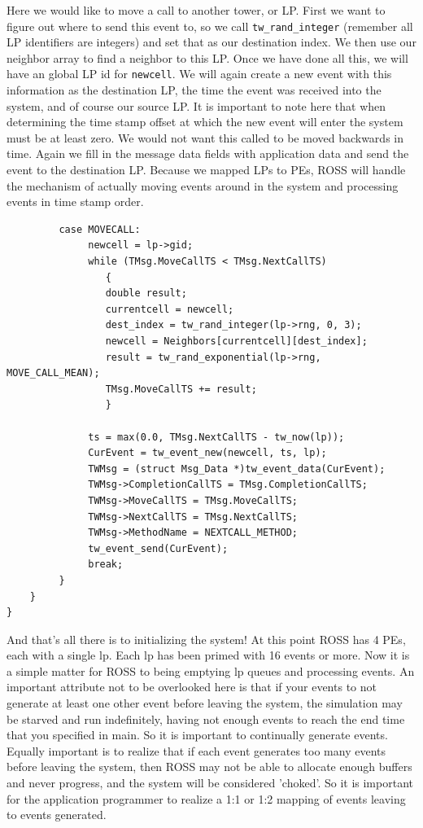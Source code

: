 \documentclass[12pt]{article}
\begin{document}
Here we would like to move a call to another tower, or LP.  First we want to
figure out where to send this event to, so we call {\tt tw\_rand\_integer}
(remember all LP identifiers are integers) and set that as our destination
index.  We then use our neighbor array to find a neighbor to this LP.  Once we
have done all this, we will have an global LP id for {\tt newcell}.  We will
again create a new event with this information as the destination LP, the time
the event was received into the system, and of course our source LP.  It is
important to note here that when determining the time stamp offset at which
the new event will enter the system must be at least zero.  We would not want
this called to be moved backwards in time.  Again we fill in the message data
fields with application data and send the event to the destination LP.
Because we mapped LPs to PEs, ROSS will handle the mechanism of actually
moving events around in the system and processing events in time stamp order.

\begin{verbatim} 
         case MOVECALL:
              newcell = lp->gid;
              while (TMsg.MoveCallTS < TMsg.NextCallTS)
                 {
                 double result;
                 currentcell = newcell;
                 dest_index = tw_rand_integer(lp->rng, 0, 3);
                 newcell = Neighbors[currentcell][dest_index];
                 result = tw_rand_exponential(lp->rng, MOVE_CALL_MEAN);
                 TMsg.MoveCallTS += result;
                 }

              ts = max(0.0, TMsg.NextCallTS - tw_now(lp));
              CurEvent = tw_event_new(newcell, ts, lp);
              TWMsg = (struct Msg_Data *)tw_event_data(CurEvent);
              TWMsg->CompletionCallTS = TMsg.CompletionCallTS;
              TWMsg->MoveCallTS = TMsg.MoveCallTS;
              TWMsg->NextCallTS = TMsg.NextCallTS;
              TWMsg->MethodName = NEXTCALL_METHOD;
              tw_event_send(CurEvent);
              break;
         }
    }
}
\end{verbatim} 

And that's all there is to initializing the system!  At this point ROSS has 4
PEs, each with a single lp.  Each lp has been primed with 16 events or more.
Now it is a simple matter for ROSS to being emptying lp queues and processing
events.  An important attribute not to be overlooked here is that if your
events to not generate at least one other event before leaving the system, the
simulation may be starved and run indefinitely, having not enough events to
reach the end time that you specified in main.  So it is important to
continually generate events.  Equally important is to realize that if each
event generates too many events before leaving the system, then ROSS may not
be able to allocate enough buffers and never progress, and the system will be
considered 'choked'.  So it is important for the application programmer to
realize a 1:1 or 1:2 mapping of events leaving to events generated.
\end{document}
